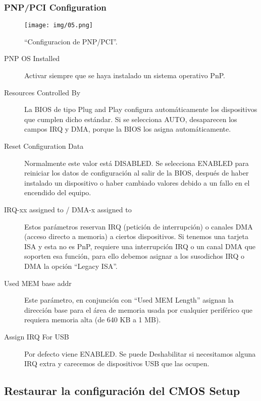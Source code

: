 		\subsubsection{PNP/PCI Configuration}\label{sub:pnp/pci configuration}
			\begin{figure}[H]
				\centering
					\texttt{[image: img/05.png]}
				\caption{``Configuracion de PNP/PCI''.}
			\end{figure}
			\begin{description}
				\item[PNP OS Installed] Activar siempre que se haya instalado un
					sistema operativo PnP. 
				\item[Resources Controlled By] La BIOS de tipo Plug and Play
					configura automáticamente los dispositivos que cumplen
					dicho estándar. Si se selecciona AUTO, desaparecen los
					campos IRQ y DMA, porque la BIOS los asigna
					automáticamente.
				\item[Reset Configuration Data] Normalmente este valor está
					DISABLED. Se selecciona ENABLED para reiniciar los datos de
					configuración al salir de la BIOS, después de haber
					instalado un dispositivo o haber cambiado valores debido a
					un fallo en el encendido del equipo.
				\item[IRQ-xx assigned to / DMA-x assigned to] Estos parámetros
					reservan IRQ (petición de interrupción) o canales DMA
					(acceso directo a memoria) a ciertos dispositivos. Si
					tenemos una tarjeta ISA y esta no es PnP, requiere una
					interrupción IRQ o un canal DMA que soporten esa función,
					para ello debemos asignar a los susodichos IRQ o DMA la
					opción “Legacy ISA”.
				\item[Used MEM base addr] Este parámetro, en conjunción con
					“Used MEM Length” asignan la dirección base para el área de
					memoria usada por cualquier periférico que requiera memoria
					alta (de 640 KB a 1 MB).
				\item[Assign IRQ For USB] Por defecto viene ENABLED. Se puede
					Deshabilitar si necesitamos alguna IRQ extra y carecemos de
					dispositivos USB que las ocupen.
			\end{description}

		\newpage

	\subsection{Restaurar la configuración del CMOS Setup}{\label{sec:cmossetup/resetear-el-cmos-setup}}

